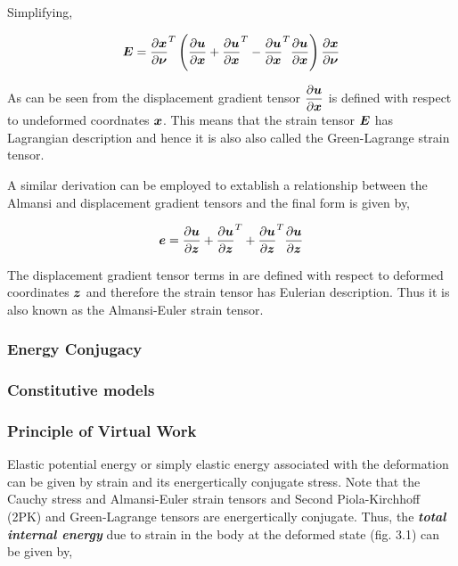 \noindent Simplifying,

\begin{equation}
  \matr{E}=\transpose{\delby{\vect{x}}{\vect{\nu}}}
           \pbrac{\delby{\vect{u}}{\vect{x}}+\transpose{\delby{\vect{u}}{\vect{x}}}-
	   \transpose{\delby{\vect{u}}{\vect{x}}}\delby{\vect{u}}{\vect{x}}}
	   \delby{\vect{x}}{\vect{\nu}}
  \label{eqn:greendisplacement2}
\end{equation}
 
As can be seen from  the displacement gradient tensor $\delby{\vect{u}}{\vect{x}}$ is defined with respect to 
undeformed coordnates $\vect{x}$. This means that the strain tensor $\matr{E}$ has Lagrangian description and hence it is also also called 
the Green-Lagrange strain tensor. 
 
A similar derivation can be employed to extablish a relationship between the Almansi and displacement gradient tensors and the final
form is given by,

\begin{equation}
  \vect{e}=\delby{\vect{u}}{\vect{z}}+\transpose{\delby{\vect{u}}{\vect{z}}}+
	   \transpose{\delby{\vect{u}}{\vect{z}}}\delby{\vect{u}}{\vect{z}}
  \label{eqn:almansidisplacement}
\end{equation}
 
The displacement gradient tensor terms in  are defined with respect to deformed coordinates $\vect{z}$ and
therefore the strain tensor has Eulerian description. Thus it is also known as the Almansi-Euler strain tensor.

\subsubsection{Energy Conjugacy}



\subsubsection{Constitutive models}



\subsubsection{Principle of Virtual Work}
Elastic potential energy or simply elastic energy associated with the deformation can be given by strain and its energertically conjugate stress. 
Note that the Cauchy stress and Almansi-Euler strain tensors and Second Piola-Kirchhoff (2PK) and Green-Lagrange tensors are energertically 
conjugate. Thus, the \textit{\textbf{total internal energy}} due to strain in the body at the deformed state (fig. 3.1) can be given by,
 
